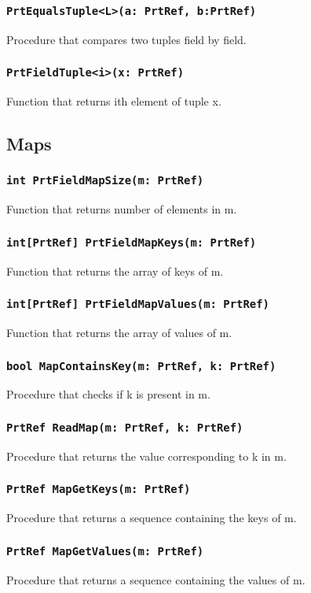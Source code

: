 \documentclass{llncs}
\begin{document}
\subsubsection{\texttt{PrtEqualsTuple<L>(a: PrtRef, b:PrtRef)} }
Procedure that compares two tuples field by field.
\subsubsection{\texttt{PrtFieldTuple<i>(x: PrtRef)} }
Function that returns ith element of tuple x.
\subsection {Maps} 
\subsubsection{\texttt{int PrtFieldMapSize(m: PrtRef)} }
Function that returns number of elements in m.
\subsubsection{\texttt{int{[}PrtRef{]} PrtFieldMapKeys(m: PrtRef)}} 
Function that returns the array of keys of m.
\subsubsection{\texttt{int{[}PrtRef{]} PrtFieldMapValues(m: PrtRef)}} 
Function that returns the array of values of m.
\subsubsection{\texttt{bool MapContainsKey(m: PrtRef, k: PrtRef)}} 
Procedure that checks if k is present in m.
\subsubsection{\texttt{PrtRef ReadMap(m: PrtRef, k: PrtRef)} }
Procedure that returns the value corresponding to k in m.
\subsubsection{\texttt{PrtRef MapGetKeys(m: PrtRef)} }
Procedure that returns a sequence containing the keys of m.
\subsubsection{\texttt{PrtRef MapGetValues(m: PrtRef)} }
Procedure that returns a sequence containing the values of m.
\end{document}
